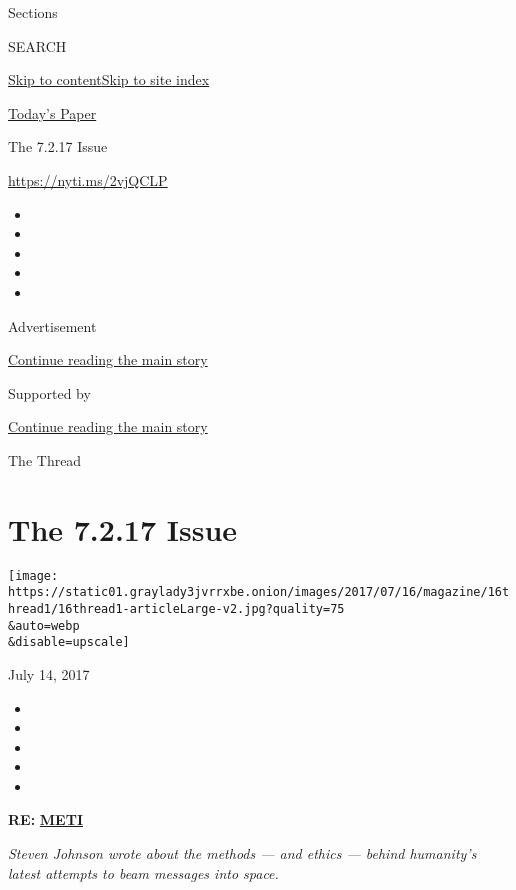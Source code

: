 Sections

SEARCH

\protect\hyperlink{site-content}{Skip to
content}\protect\hyperlink{site-index}{Skip to site index}

\href{https://myaccount.nytimes3xbfgragh.onion/auth/login?response_type=cookie\&client_id=vi}{}

\href{https://www.nytimes3xbfgragh.onion/section/todayspaper}{Today's
Paper}

The 7.2.17 Issue

\url{https://nyti.ms/2vjQCLP}

\begin{itemize}
\item
\item
\item
\item
\item
\end{itemize}

Advertisement

\protect\hyperlink{after-top}{Continue reading the main story}

Supported by

\protect\hyperlink{after-sponsor}{Continue reading the main story}

The Thread

\hypertarget{the-7217-issue}{%
\section{The 7.2.17 Issue}\label{the-7217-issue}}

\texttt{[image: https://static01.graylady3jvrrxbe.onion/images/2017/07/16/magazine/16thread1/16thread1-articleLarge-v2.jpg?quality=75\\\&auto=webp\\\&disable=upscale]}

July 14, 2017

\begin{itemize}
\item
\item
\item
\item
\item
\end{itemize}

\textbf{RE:}
\href{https://www.nytimes3xbfgragh.onion/2017/06/28/magazine/greetings-et-please-dont-murder-us.html}{\textbf{METI}}

\emph{Steven Johnson wrote about the methods --- and ethics --- behind
humanity's latest attempts to beam messages into space.}

